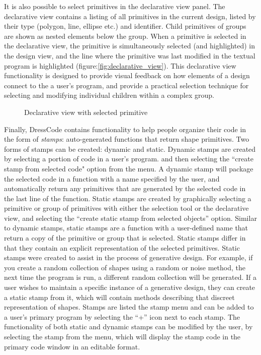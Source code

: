 \documentclass{sigchi}
\begin{document}
It is also possible to select primitives in the declarative view panel. The declarative view contains a listing of all primitives in the current design, listed by their type (polygon, line, ellipse etc.) and identifier. Child primitives of groups are shown as nested elements below the group. When a primitive is selected in the declarative view, the primitive is simultaneously selected (and highlighted) in the design view, and the line where the primitive was last modified in the textual program is highlighted (figure:\ref{fig:declarative_view}). This declarative view functionality is designed to provide visual feedback on how elements of a design connect to the a user's program, and provide a practical selection technique for selecting and modifying individual children within a complex group.


\begin{center}
\begin{figure}[h!]
\caption{Declarative view with selected primitive}
\label{fig:declarative view}
\end{figure}
\end{center}

Finally, DressCode contains functionality to help people organize their code in the form of \textit{stamps}: auto-generated functions that return shape primitives. Two forms of stamps can be created: dynamic and static. Dynamic stamps are created by selecting a portion of code in a user's program. and then selecting the ``create stamp from selected code" option from the menu. A dynamic stamp will package the selected code in a function with a name specified by the user, and automatically return any primitives that are generated by the selected code in the last line of the function. Static stamps are created by graphically selecting a primitive or group of primitives with either the selection tool or the declarative view, and selecting the ``create static stamp from selected objects'' option. Similar to dynamic stamps, static stamps are a function with a user-defined name that return a copy of the primitive or group that is selected. Static stamps differ in that they contain an explicit representation of the selected primitives. Static stamps were created to assist in the process of generative design. For example, if you create a random collection of shapes using a random or noise method, the next time the program is run, a different random collection will be generated. If a user wishes to maintain a specific instance of a generative design, they can create a static stamp from it, which will contain methods describing that discreet representation of shapes. Stamps are listed the stamp menu and can be added to a user's primary program by selecting the ``+'' icon next to each stamp. The functionality of both static and dynamic stamps can be modified by the user, by selecting the stamp from the menu, which will display the stamp code in the primary code window in an editable format.
\end{document}
